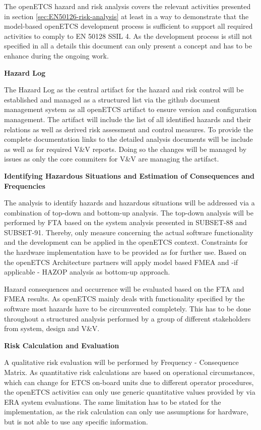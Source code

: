 \documentclass{template/openetcs_report}
\begin{document}
The openETCS hazard and risk analysis covers the relevant activities presented in section \ref{sec:EN50126-risk-analysis} at least in a way to demonstrate that the model-based openETCS development process is sufficient to support all required activities to comply to EN 50128 SSIL 4. As the development process is still not specified in all a details this document can only present a concept and has to be enhance during the ongoing work.

\textbf{Hazard Log}

The Hazard Log as the central artifact for the hazard and risk control will be established and managed as a structured list via the github document management system as all openETCS artifact to ensure version and configuration management. The artifact will include the list of all identified hazards and their relations as well as derived risk assessment and control measures. To provide the complete documentation links to the detailed analysis documents will be include as well as for required V\&V reports. Doing so the changes will be managed by issues as only the core commiters for V\&V are managing the artifact. 

\textbf{Identifying Hazardous Situations and Estimation of Consequences and Frequencies}

The analysis to identify hazards and hazardous situations will be addressed via a combination of top-down and bottom-up analysis. The top-down analysis will be performed by FTA based on the system analysis presented in SUBSET-88 and SUBSET-91. Thereby, only measure concerning the actual software functionality and the development can be applied in the openETCS context. Constraints for the hardware implementation have to be provided as for further use.
Based on the openETCS Architecture partners will apply model based FMEA and -if applicable - HAZOP analysis as bottom-up approach. 

Hazard consequences and occurrence will be evaluated based on the FTA and FMEA results. As openETCS mainly deals with functionality specified by the software most hazards have to be circumvented completely. This has to be done throughout a structured analysis performed by a group of different stakeholders from system, design and V\&V.

\textbf{Risk Calculation and Evaluation}

A qualitative risk evaluation will be performed by Frequency - Consequence Matrix. As quantitative risk calculations are based on operational circumstances, which can change for ETCS on-board units due to different operator procedures, the openETCS activities can only use generic quantitative values provided by via ERA system evaluations. The same limitation has to be stated for the implementation, as the risk calculation can only use assumptions for hardware, but is not able to use any specific information.
\end{document}
